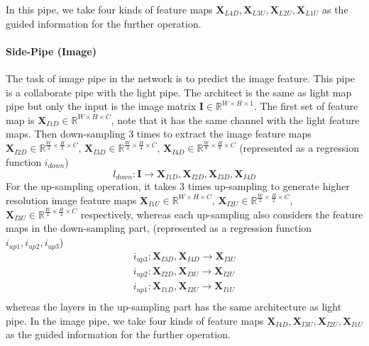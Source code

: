 In this pipe, we take four kinds of feature maps $ \textbf{X}_{L4D}, \textbf{X}_{L3U},\textbf{X}_{L2U}, \textbf{X}_{L1U} $ as the guided information for the further operation.


\paragraph{Side-Pipe (Image)}
The task of image pipe in the network is to predict the image feature. This pipe is a collaborate pipe with the light pipe. The architect is the same as light map pipe but only the input is the image matrix $ \textbf{I}\in  \mathbb{R}^{W\times H\times 1}$. The first set of feature map is $ \textbf{X}_{I1D} \in \mathbb{R}^{{W}\times H\times C} $, note that it has the same channel with the light feature maps. Then down-sampling 3 times to extract the image feature maps
$ \textbf{X}_{I2D} \in \mathbb{R}^{\frac{W}{2}\times \frac{H}{2}\times C} $,
$ \textbf{X}_{I3D} \in \mathbb{R}^{\frac{W}{4}\times \frac{H}{4}\times C} $,
$ \textbf{X}_{I4D} \in \mathbb{R}^{\frac{W}{8}\times \frac{H}{8}\times C} $
(represented as a regression function $ i_{down} $)
\[ l_{down}: \textbf{I} \rightarrow  \textbf{X}_{I1D} , \textbf{X}_{I2D}, \textbf{X}_{I3D}, \textbf{X}_{I4D} \]
For the up-sampling operation, it takes 3 times up-sampling to generate higher resolution image feature maps
$ \textbf{X}_{I1U} \in \mathbb{R}^{{W}\times {H}\times C} $,
$ \textbf{X}_{I2U} \in \mathbb{R}^{\frac{W}{2}\times \frac{H}{2}\times C} $,
$ \textbf{X}_{I3U} \in \mathbb{R}^{\frac{W}{4}\times \frac{H}{4}\times C} $ respectively, whereas each up-sampling also considers the feature maps in the down-sampling part,
(represented as a regression function $ i_{up1}, i_{up2}, i_{up3} $)
\[ 
\begin{matrix}
	i_{up3} : \textbf{X}_{I3D}, \textbf{X}_{I4D} \rightarrow \textbf{X}_{I3U} \\
	i_{up2} : \textbf{X}_{I2D}, \textbf{X}_{I3U} \rightarrow \textbf{X}_{I2U} \\
	i_{up1} : \textbf{X}_{I1D}, \textbf{X}_{I2U} \rightarrow \textbf{X}_{I1U} \\
\end{matrix}
\]
whereas the layers in the up-sampling part has the same architecture as light pipe. In the image pipe, we take four kinds of feature maps $ \textbf{X}_{I4D}, \textbf{X}_{I3U},\textbf{X}_{I2U}, \textbf{X}_{I1U} $ as the guided information for the further operation.


